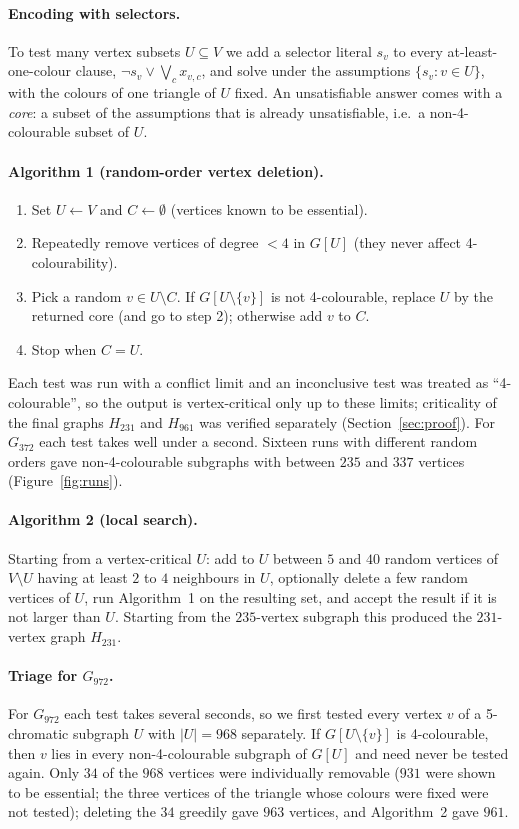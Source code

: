 \documentclass[11pt]{article}
\theoremstyle{remark}
\begin{document}
\paragraph{Encoding with selectors.} To test many vertex subsets $U\subseteq V$ we add a selector literal
$s_v$ to every at-least-one-colour clause, $\neg s_v\vee\bigvee_c x_{v,c}$, and solve under the
assumptions $\{s_v:v\in U\}$, with the colours of one triangle of $U$ fixed. An unsatisfiable answer comes
with a \emph{core}: a subset of the assumptions that is already unsatisfiable, i.e.\ a non-4-colourable
subset of $U$.

\paragraph{Algorithm 1 (random-order vertex deletion).}
\begin{enumerate}
\item Set $U\leftarrow V$ and $C\leftarrow\emptyset$ (vertices known to be essential).
\item Repeatedly remove vertices of degree $<4$ in $G[U]$ (they never affect 4-colourability).
\item Pick a random $v\in U\setminus C$. If $G[U\setminus\{v\}]$ is not 4-colourable, replace $U$ by the
returned core (and go to step 2); otherwise add $v$ to $C$.
\item Stop when $C=U$.
\end{enumerate}
Each test was run with a conflict limit and an inconclusive test was treated as ``4-colourable'', so the
output is vertex-critical only up to these limits; criticality of the final graphs $H_{231}$ and $H_{961}$
was verified separately (Section~\ref{sec:proof}).
For $G_{372}$ each test takes well under a second. Sixteen runs with different random orders gave
non-4-colourable subgraphs with between $235$ and $337$ vertices (Figure~\ref{fig:runs}).

\paragraph{Algorithm 2 (local search).} Starting from a vertex-critical $U$: add to $U$ between $5$ and $40$
random vertices of $V\setminus U$ having at least $2$ to $4$ neighbours in $U$, optionally delete a few
random vertices of $U$, run Algorithm~1 on the resulting set, and accept the result if it is not larger
than $U$. Starting from the $235$-vertex subgraph this produced the $231$-vertex graph $H_{231}$.

\paragraph{Triage for $G_{972}$.} For $G_{972}$ each test takes several seconds, so we first tested every
vertex $v$ of a 5-chromatic subgraph $U$ with $|U|=968$ separately. If $G[U\setminus\{v\}]$ is
4-colourable, then $v$ lies in every non-4-colourable subgraph of $G[U]$ and need never be tested again.
Only $34$ of the $968$ vertices were individually removable ($931$ were shown to be essential; the three
vertices of the triangle whose colours were fixed were not tested); deleting the $34$ greedily gave $963$
vertices, and Algorithm~2 gave $961$.
\end{document}
